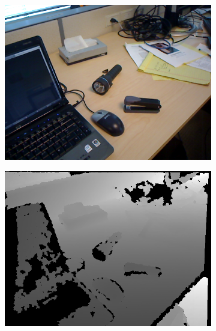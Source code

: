 \documentclass[preprint,10pt,5p,times,twocolumn]{elsarticle}
\begin{document}
\begin{figure}[t]
\begin{center}
\begin{subfigure}[b]{0.136\linewidth}
    \includegraphics[width=\linewidth]{desk_structure_missing_color.png}
\end{subfigure}
\begin{subfigure}[b]{0.136\linewidth}
    \includegraphics[width=\linewidth]{desk_structure_missing_depth.png}
\end{subfigure}
\begin{subfigure}[b]{0.136\linewidth}

\end{subfigure}
\end{center}
\end{figure}
\end{document}
